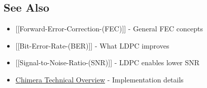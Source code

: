 \subsection{See Also}\label{see-also}

\begin{itemize}
\tightlist
\item
  {[}{[}Forward-Error-Correction-(FEC){]}{]} - General FEC concepts
\item
  {[}{[}Bit-Error-Rate-(BER){]}{]} - What LDPC improves
\item
  {[}{[}Signal-to-Noise-Ratio-(SNR){]}{]} - LDPC enables lower SNR
\item
  \href{../docs/chimera_technical_overview.md}{Chimera Technical
  Overview} - Implementation details
\end{itemize}
